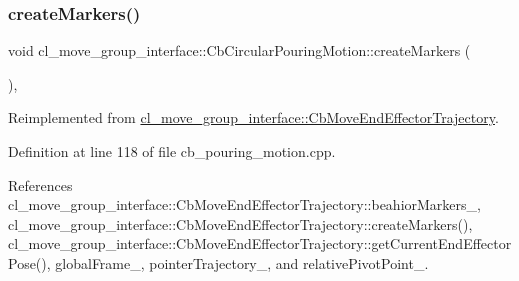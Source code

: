 \subsubsection{\texorpdfstring{create\+Markers()}{createMarkers()}}
{\footnotesize\ttfamily void cl\+\_\+move\+\_\+group\+\_\+interface\+::\+Cb\+Circular\+Pouring\+Motion\+::create\+Markers (\begin{DoxyParamCaption}{ }\end{DoxyParamCaption})\hspace{0.3cm}{\ttfamily [override]}, {\ttfamily [virtual]}}



Reimplemented from \hyperlink{classcl__move__group__interface_1_1CbMoveEndEffectorTrajectory_a442efa1d5bc9e9a16f74ecd31b13d9b5}{cl\+\_\+move\+\_\+group\+\_\+interface\+::\+Cb\+Move\+End\+Effector\+Trajectory}.



Definition at line 118 of file cb\+\_\+pouring\+\_\+motion.\+cpp.



References cl\+\_\+move\+\_\+group\+\_\+interface\+::\+Cb\+Move\+End\+Effector\+Trajectory\+::beahior\+Markers\+\_\+, cl\+\_\+move\+\_\+group\+\_\+interface\+::\+Cb\+Move\+End\+Effector\+Trajectory\+::create\+Markers(), cl\+\_\+move\+\_\+group\+\_\+interface\+::\+Cb\+Move\+End\+Effector\+Trajectory\+::get\+Current\+End\+Effector\+Pose(), global\+Frame\+\_\+, pointer\+Trajectory\+\_\+, and relative\+Pivot\+Point\+\_\+.


